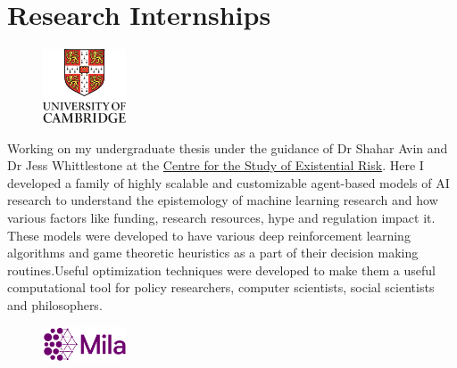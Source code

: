 \documentclass[]{deedy-resume-openfont}
\begin{document}
\begin{minipage}[t]{0.66\textwidth}

\section{Research Internships}
\begin{figure}
  \begin{center}
    \includegraphics[width=0.22\textwidth]{cam_logo.jpg}
  \end{center}
\end{figure}
Working on my undergraduate thesis under the guidance of Dr Shahar Avin and Dr Jess Whittlestone at the \href{https://www.cser.ac.uk/}{Centre for the Study of Existential Risk}. Here I developed a family of highly scalable and customizable agent-based models of AI research to understand the epistemology of machine learning research and how various factors like funding, research resources, hype and regulation impact it. These models were developed to have various deep reinforcement learning algorithms and game theoretic heuristics as a part of their decision making routines.Useful optimization techniques were developed  to make them a useful computational tool for policy researchers, computer scientists, social scientists and philosophers.


\sectionsep


\begin{figure}
  \begin{center}
    \includegraphics[width=0.22\textwidth]{mila.png}
  \end{center}
\end{figure}


\end{minipage}
\end{document}
